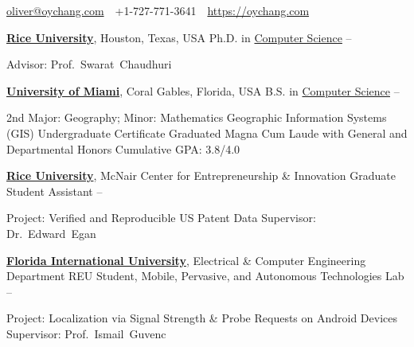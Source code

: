 \documentclass[letterpaper,MMMyyyy,nonstopmode]{simpleresumecv}
\newcommand{\CVAuthor}{Oliver Chang}
\newcommand{\CVWebpage}{https://oychang.com}
\begin{document}

\Title{\CVAuthor}

\begin{SubTitle}
\href{mailto:oliver@oychang.com}{oliver@oychang.com}
\,\SubBulletSymbol\,
+1-727-771-3641
\,\SubBulletSymbol\,
\href{\CVWebpage}
{\url{\CVWebpage}}
\end{SubTitle}

\begin{Body}



\Entry
\href{http://www.rice.edu/}{\textbf{Rice University}},
Houston, Texas, USA
\Gap
\BulletItem
Ph.D. in \href{http://www.cs.rice.edu/}{Computer Science}
\hfill
{} -- 
\begin{Detail}
\SubBulletItem Advisor: Prof.~Swarat~Chaudhuri
\end{Detail}

\BigGap

\Entry
\href{http://welcome.miami.edu/}{\textbf{University of Miami}},
Coral Gables, Florida, USA
\Gap
\BulletItem
B.S. in \href{http://www.as.miami.edu/csc/}{Computer Science}
\hfill
{} -- 
\begin{Detail}
\SubBulletItem 2nd Major: Geography; Minor: Mathematics
\SubBulletItem Geographic Information Systems (GIS) Undergraduate Certificate
\SubBulletItem Graduated Magna Cum Laude with General and Departmental Honors
\SubBulletItem Cumulative GPA: 3.8/4.0
\end{Detail}



\Entry
\href{http://www.rice.edu/}{\textbf{Rice University}}, McNair Center for Entrepreneurship \& Innovation
\Gap
\BulletItem Graduate Student Assistant
\hfill {} -- 
\begin{Detail}
\SubBulletItem
Project: Verified and Reproducible US Patent Data
\SubBulletItem
Supervisor: Dr.~Edward~Egan
\end{Detail}

\Entry
\href{http://www.fiu.edu/}{\textbf{Florida International University}}, Electrical \& Computer Engineering Department
\Gap
\BulletItem REU Student, Mobile, Pervasive, and Autonomous Technologies Lab
\hfill {} -- 
\begin{Detail}
\SubBulletItem
Project: Localization via Signal Strength \& Probe Requests on Android Devices
\SubBulletItem
Supervisor: Prof.~Ismail~Guvenc
\end{Detail}


\end{Body}
\end{document}
